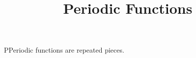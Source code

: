 \documentclass{ximera}
\title{Periodic Functions}
\begin{document}
\begin{abstract}

\end{abstract}
\maketitle



PPeriodic functions are repeated pieces.
\end{document}
